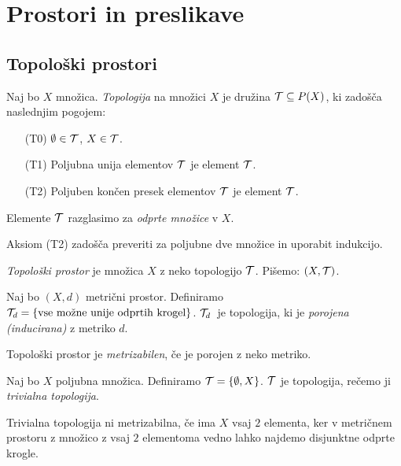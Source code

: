\section{Prostori in preslikave}
\subsection{Topološki prostori}
\begin{definicija}
    Naj bo $X$ množica. \emph{Topologija} na množici $X$ je družina $\mathcal{T} \subseteq P(X)$, ki zadošča naslednjim pogojem:
    \begin{enumerate}
        \item[(T0)] $\emptyset \in \mathcal{T}$, $X \in \mathcal{T}$.
        \item[(T1)] Poljubna unija elementov $\mathcal{T}$ je element $\mathcal{T}$.
        \item[(T2)] Poljuben končen presek elementov $\mathcal{T}$ je element $\mathcal{T}$.
    \end{enumerate}
    Elemente $\mathcal{T}$ razglasimo za \emph{odprte množice} v $X$.
\end{definicija}

\begin{opomba}
    Aksiom (T2) zadošča preveriti za poljubne dve množice in uporabit indukcijo.
\end{opomba}

\begin{definicija}
    \emph{Topološki prostor} je množica $X$ z neko topologijo $\mathcal{T}$. Pišemo: $(X, \mathcal{T})$.
\end{definicija}

\begin{primer}
    Naj bo $(X, d)$ metrični prostor. Definiramo $\mathcal{T}_d = \left\{\text{vse možne unije odprtih krogel}\right\}$. $\mathcal{T}_d$~je topologija, ki je \emph{porojena (inducirana)} z metriko $d$.
\end{primer}

\begin{definicija}
    Topološki prostor je \emph{metrizabilen}, če je porojen z neko metriko.
\end{definicija}

\begin{primer}
    Naj bo $X$ poljubna množica. Definiramo $\mathcal{T} = \left\{\emptyset, X\right\}$. $\mathcal{T}$ je topologija, rečemo ji \emph{trivialna topologija}.

    Trivialna topologija ni metrizabilna, če ima $X$ vsaj $2$ elementa, ker v metričnem prostoru z množico z vsaj $2$ elementoma vedno lahko najdemo disjunktne odprte krogle.
\end{primer}

